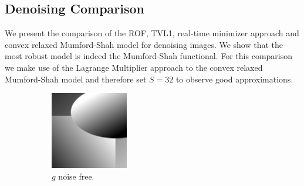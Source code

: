 \documentclass[abstracton]{scrreprt}
\begin{document}

        \subsection{Denoising Comparison} %
        \label{sub:denoising_comparison}
            We present the comparison of the ROF, TVL1, real-time minimizer approach and convex relaxed Mumford-Shah model for denoising images. We show that the most robust model is indeed the Mumford-Shah functional. For this comparison we make use of the Lagrange Multiplier approach to the convex relaxed Mumford-Shah model and therefore set $S = 32$ to observe good approximations.\\
            \begin{figure}[!ht]
                \centering
                \begin{subfigure}[b]{0.31\textwidth}
                    \includegraphics[width=\textwidth]{img/images/synth.png}
                    \caption{$g$ noise free.}
                \end{subfigure}
                \begin{subfigure}[b]{0.31\textwidth}

\end{subfigure}
\end{figure}
\end{document}

